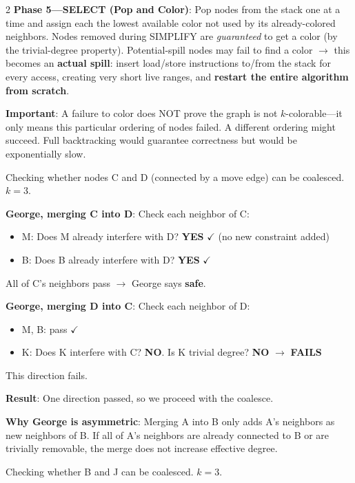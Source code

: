 \documentclass[9pt,landscape]{extarticle}
\begin{document}
\begin{multicols}{2}
\textbf{Phase 5---SELECT (Pop and Color)}: Pop nodes from the stack one at a time and assign each the lowest available color not used by its already-colored neighbors. Nodes removed during SIMPLIFY are \emph{guaranteed} to get a color (by the trivial-degree property). Potential-spill nodes may fail to find a color $\to$ this becomes an \textbf{actual spill}: insert load/store instructions to/from the stack for every access, creating very short live ranges, and \textbf{restart the entire algorithm from scratch}.

\textbf{Important}: A failure to color does NOT prove the graph is not $k$-colorable---it only means this particular ordering of nodes failed. A different ordering might succeed. Full backtracking would guarantee correctness but would be exponentially slow.

\begin{exambox}
Checking whether nodes C and D (connected by a move edge) can be coalesced. $k = 3$.

\textbf{George, merging C into D}: Check each neighbor of C:
\begin{itemize}
  \item M: Does M already interfere with D? \textbf{YES} $\checkmark$ (no new constraint added)
  \item B: Does B already interfere with D? \textbf{YES} $\checkmark$
\end{itemize}
All of C's neighbors pass $\to$ George says \textbf{safe}.

\textbf{George, merging D into C}: Check each neighbor of D:
\begin{itemize}
  \item M, B: pass $\checkmark$
  \item K: Does K interfere with C? \textbf{NO}. Is K trivial degree? \textbf{NO} $\to$ \textbf{FAILS}
\end{itemize}
This direction fails.

\textbf{Result}: One direction passed, so we proceed with the coalesce.

\textbf{Why George is asymmetric}: Merging A into B only adds A's neighbors as new neighbors of B. If all of A's neighbors are already connected to B or are trivially removable, the merge does not increase effective degree.
\end{exambox}

\begin{exambox}
Checking whether B and J can be coalesced. $k = 3$.


\end{exambox}
\end{multicols}
\end{document}

